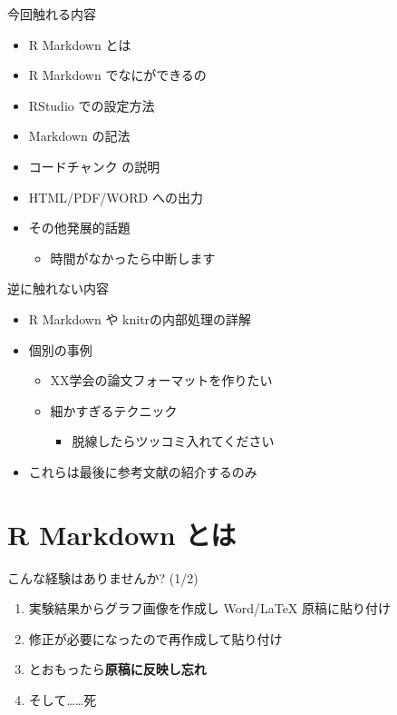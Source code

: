 \documentclass[
  ignorenonframetext,
]{beamer}
\providecommand{\tightlist}{%
  \setlength{\itemsep}{0pt}\setlength{\parskip}{0pt}}
\begin{document}
\begin{frame}{今回触れる内容}
\protect\hypertarget{ux4ecaux56deux89e6ux308cux308bux5185ux5bb9}{}
\begin{itemize}
\tightlist
\item
  R Markdown とは
\item
  R Markdown でなにができるの
\item
  RStudio での設定方法
\item
  Markdown の記法
\item
  コードチャンク の説明
\item
  HTML/PDF/WORD への出力
\item
  その他発展的話題

  \begin{itemize}
  \tightlist
  \item
    時間がなかったら中断します
  \end{itemize}
\end{itemize}
\end{frame}

\begin{frame}{逆に触れない内容}
\protect\hypertarget{ux9006ux306bux89e6ux308cux306aux3044ux5185ux5bb9}{}
\begin{itemize}
\item
  R Markdown や knitrの内部処理の詳解
\item
  個別の事例

  \begin{itemize}
  \item
    XX学会の論文フォーマットを作りたい
  \item
    細かすぎるテクニック

    \begin{itemize}
    \tightlist
    \item
      脱線したらツッコミ入れてください
    \end{itemize}
  \end{itemize}
\item
  これらは最後に参考文献の紹介するのみ
\end{itemize}
\end{frame}

\hypertarget{r-markdown-ux3068ux306f}{%
\section{R Markdown とは}\label{r-markdown-ux3068ux306f}}

\begin{frame}{こんな経験はありませんか? (1/2)}
\protect\hypertarget{ux3053ux3093ux306aux7d4cux9a13ux306fux3042ux308aux307eux305bux3093ux304b-12}{}
\begin{enumerate}
\item
  実験結果からグラフ画像を作成し Word/LaTeX 原稿に貼り付け
\item
  修正が必要になったので再作成して貼り付け
\item
  とおもったら\textbf{原稿に反映し忘れ}
\item
  そして\ldots\ldots 死
\end{enumerate}
\end{frame}
\end{document}
